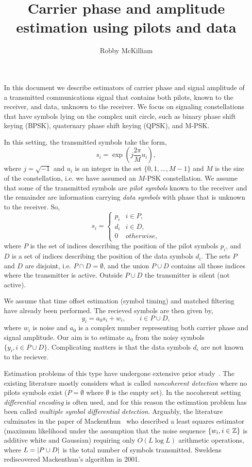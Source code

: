 \documentclass[a4paper,10pt]{article}
\title{Carrier phase and amplitude estimation using pilots and data}
\author{Robby McKilliam}
\begin{document}
\maketitle

In this document we describe estimators of carrier phase and signal amplitude of a transmitted communications signal that contains both pilots, known to the receiver, and data, unknown to the receiver.  We focus on signaling constellations that have symbols lying on the complex unit circle, such as binary phase shift keying (BPSK), quaternary phase shift keying (QPSK), and M-PSK.  

In this setting, the transmitted symbols take the form,
\[
s_i = \exp\left( j\frac{2\pi}{M} u_i \right),
\]
where $j = \sqrt{-1}$ and $u_i$ is an integer in the set $\{0, 1, \dots, M-1\}$ and $M$ is the size of the constellation, i.e. we have assumed an $M$-PSK constellation.  We assume that some of the transmitted symbols are \emph{pilot symbols} known to the receiver and the remainder are information carrying \emph{data symbols} with phase that is unknown to the receiver.  So,
\[
s_i = \begin{cases}
p_i & i \in P, \\
d_i & i \in D, \\
0 & otherwise,
\end{cases}
\]
where $P$ is the set of indices describing the position of the pilot symbols $p_i$, and $D$ is a set of indices describing the position of the data symbols $d_i$.  The sets $P$ and $D$ are disjoint, i.e. $P \cap D = \emptyset$, and the union $P \cup D$ contains all those indices where the transmitter is active.  Outside $P \cup D$ the transmitter is silent (not active).  

We assume that time offset estimation (symbol timing) and matched filtering have already been performed.  The recieved symbols are then given by,
\begin{equation}\label{eq:sigmod}
y_i = a_0 s_i + w_i, \qquad i \in P \cup D,
\end{equation}
where $w_i$ is noise and $a_0$ is a complex number representing both carrier phase and signal amplitude.  Our aim is to estimate $a_0$ from the noisy symbols $\{ y_i, i \in P \cup D \}$.  Complicating matters is that the data symbols $d_i$ are not known to the reciever.  

Estimation problems of this type have undergone extensive prior study~\cite{Wilson1989,Makrakis1990,Liu1991,Mackenthun1994,Sweldens2001}.  The existing literature mostly considers what is called \emph{noncoherent detection} where no pilots symbols exist ($P = \emptyset$ where $\emptyset$ is the empty set).  In the nocoherent setting \emph{differential encoding} is often used, and for this reason the estimation problem has been called \emph{multiple symbol differential detection}.  Arguably, the literature culminates in the paper of Mackenthun~\cite{Mackenthun1994} who described a least squares estimator (maximum likelihood under the assumption that the noise sequence $\{w_i, i \in {\mathbb Z}\}$ is additive white and Gaussian) requiring only $O(L \log L)$ arithmetic operations, where $L = {\left| P \cup D \right|}$ is the total number of symbols transmitted.  Sweldens~\cite{Sweldens2001} rediscovered Mackenthun's algorithm in 2001.
\end{document}
